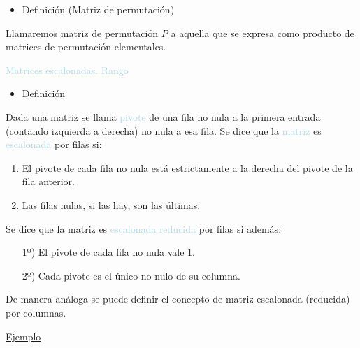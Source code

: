 \documentclass[12pt]{article}
\begin{document}
\begin{itemize}[label=\color{red}\textbullet, leftmargin=*]
    \item \color{lightblue} Definición (Matriz de permutación)
\end{itemize}
Llamaremos matriz de permutación $P$ a aquella que se expresa
como producto de matrices de permutación elementales.

\textcolor{lightblue}{\underline{Matrices escalonadas. Rango}}
\begin{itemize}[label=\color{red}\textbullet, leftmargin=*]
    \item \color{lightblue} Definición
\end{itemize}
Dada una matriz se llama \textcolor{lightblue}{pivote} de una
fila no nula a la primera entrada (contando izquierda a derecha)
no nula a esa fila. Se dice que la \textcolor{lightblue}{matriz}
es \textcolor{lightblue}{escalonada} por filas si:
\begin{enumerate}[label=\arabic*)]
\item El pivote de cada fila no nula está estrictamente a la
derecha del pivote de la fila anterior.
    \item Las filas nulas, si las hay, son las últimas.
\end{enumerate}
Se dice que la matriz es \textcolor{lightblue}{escalonada
reducida} por filas si además:
\begin{enumerate}
\item[1º)] El pivote de cada fila no nula vale 1.
\item[2º)] Cada pivote es el único no nulo de su columna.
\end{enumerate}
De manera análoga se puede definir el concepto de matriz
escalonada (reducida) por columnas.

\underline{Ejemplo}
\end{document}
